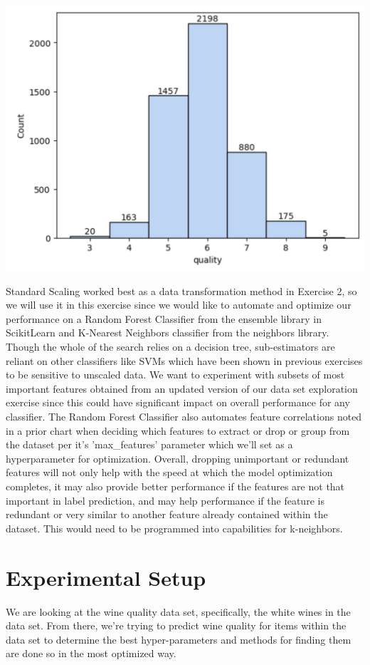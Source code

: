 \documentclass[titlepage]{article}
\begin{document}
	\begin{center}
		\includegraphics[width=.55\textwidth]{img/ww_data_distribution.png}
	\end{center}
	
	Standard Scaling worked best as a data transformation method in Exercise 2, so we will use it in this exercise since we would like to automate and optimize our performance on a Random Forest Classifier from the ensemble library in ScikitLearn \cite{scikitlearn} and K-Nearest Neighbors classifier from the neighbors library.  Though the whole of the search relies on a decision tree, sub-estimators are reliant on other classifiers like SVMs which have been shown in previous exercises to be sensitive to unscaled data.  We want to experiment with subsets of most important features obtained from an updated version of our data set exploration exercise since this could have significant impact on overall performance for any classifier.  The Random Forest Classifier also automates feature correlations noted in a prior chart when deciding which features to extract or drop or group from the dataset per it's 'max\_features' parameter which we'll set as a hyperparameter for optimization.  Overall, dropping unimportant or redundant features will not only help with the speed at which the model optimization completes, it may also provide better performance if the features are not that important in label prediction, and may help performance if the feature is redundant or very similar to another feature already contained within the dataset.  This would need to be programmed into capabilities for k-neighbors.  
	
	\section*{Experimental Setup}
		We are looking at the wine quality data set, specifically, the white wines in the data set.  From there, we're trying to predict wine quality for items within the data set to determine the best hyper-parameters and methods for finding them are done so in the most optimized way.  
		
\end{document}

